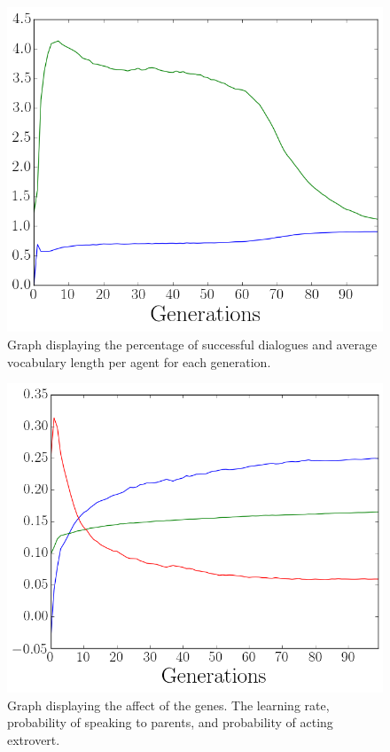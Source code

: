 \begin{figure}[htbp]
    \centering
    \includegraphics[scale=0.5]{fig/Results/Exp3/Vocabulary1}
    \caption{Graph displaying the percentage of successful dialogues and average vocabulary length per agent for each generation.}
    \label{fig:Vocabulary3}
\end{figure}
\begin{figure}[htbp]
    \centering
    \includegraphics[scale=0.5]{fig/Results/Exp3/Genes1}
    \caption{Graph displaying the affect of the genes. The learning rate, probability of speaking to parents, and probability of acting extrovert.}
    \label{fig:Genes3}
\end{figure}

